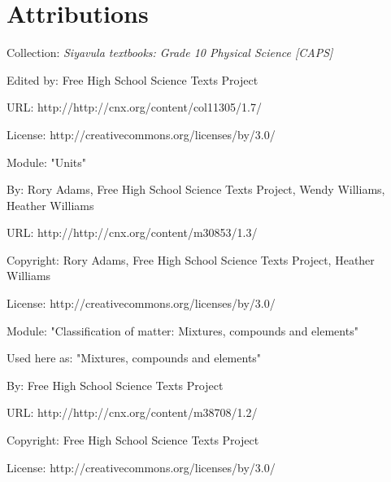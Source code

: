 \chapter{Attributions}\def\leftmark{ATTRIBUTIONS}\def\rightmark{ATTRIBUTIONS}\label{col11305*Attributions}\vspace{.3cm}\begin{minipage}{\textwidth}
    Collection: \textsl{Siyavula textbooks: Grade 10 Physical Science [CAPS]}\par\nopagebreak\noindent
    Edited by: Free High School Science Texts Project\par\nopagebreak\noindent
    URL: http://http://cnx.org/content/col11305/1.7/\par\nopagebreak\noindent
    License: http://creativecommons.org/licenses/by/3.0/\par
    \end{minipage}
    \par\vspace{9pt}\noindent\begin{minipage}{\textwidth}
      Module: "Units" \par\nopagebreak\noindent
      By: Rory Adams, Free High School Science Texts Project, Wendy Williams, Heather Williams\par\nopagebreak\noindent
      URL: http://http://cnx.org/content/m30853/1.3/\par\nopagebreak\noindent
      \par\nopagebreak\noindent
      Copyright: Rory Adams, Free High School Science Texts Project, Heather Williams\par\nopagebreak\noindent
      License:  http://creativecommons.org/licenses/by/3.0/\par\nopagebreak\noindent
      \par\end{minipage}
      \par\vspace{9pt}\noindent\begin{minipage}{\textwidth}
      Module: "Classification of matter: Mixtures, compounds and elements" \par\nopagebreak\noindent
      Used here as: "Mixtures, compounds and elements" \par\nopagebreak\noindent
        By: Free High School Science Texts Project\par\nopagebreak\noindent
      URL: http://http://cnx.org/content/m38708/1.2/\par\nopagebreak\noindent
      \par\nopagebreak\noindent
      Copyright: Free High School Science Texts Project\par\nopagebreak\noindent
      License:  http://creativecommons.org/licenses/by/3.0/\par\nopagebreak\noindent
      \par\end{minipage}
